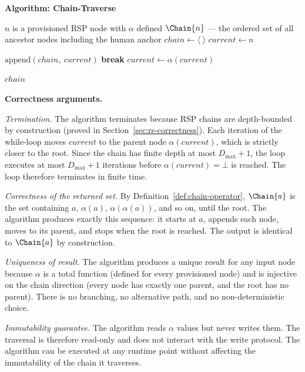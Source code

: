 \medskip
\noindent\textbf{Algorithm: Chain-Traverse}

\begin{algorithm}
\caption{Chain-Traverse($n$) --- Build the delegation chain from node $n$ to the human anchor}
\label{alg:chain-traverse}
\begin{algorithmic}[1]
\REQUIRE $n$ is a provisioned RSP node with $\alpha$ defined
\ENSURE $\Chain{n}$ --- the ordered set of all ancestor nodes including the human anchor
\STATE $chain \leftarrow \langle\ \rangle$ 
\STATE $current \leftarrow n$ 

    \STATE $\text{append}(chain,\ current)$ 
        \STATE \textbf{break} 
    \ENDIF
    \STATE $current \leftarrow \alpha(current)$ 
\ENDWHILE

\RETURN $chain$
\end{algorithmic}
\end{algorithm}

\medskip
\noindent\textbf{Correctness arguments.}

\textit{Termination.} The algorithm terminates because RSP chains are depth-bounded by construction (proved in Section~\ref{sec:rs-correctness}). Each iteration of the while-loop moves $current$ to the parent node $\alpha(current)$, which is strictly closer to the root. Since the chain has finite depth at most $D_{\max} + 1$, the loop executes at most $D_{\max} + 1$ iterations before $\alpha(current) = \bot$ is reached. The loop therefore terminates in finite time.

\textit{Correctness of the returned set.} By Definition~\ref{def:chain-operator}, $\Chain{a}$ is the set containing $a$, $\alpha(a)$, $\alpha(\alpha(a))$, and so on, until the root. The algorithm produces exactly this sequence: it starts at $a$, appends each node, moves to its parent, and stops when the root is reached. The output is identical to $\Chain{a}$ by construction.

\textit{Uniqueness of result.} The algorithm produces a unique result for any input node because $\alpha$ is a total function (defined for every provisioned node) and is injective on the chain direction (every node has exactly one parent, and the root has no parent). There is no branching, no alternative path, and no non-deterministic choice.

\textit{Immutability guarantee.} The algorithm reads $\alpha$ values but never writes them. The traversal is therefore read-only and does not interact with the write protocol. The algorithm can be executed at any runtime point without affecting the immutability of the chain it traverses.

